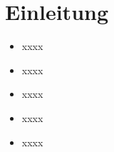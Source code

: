 \section{Einleitung}

\begin{itemize}

   \item xxxx
   \item xxxx
   \item xxxx
   \item xxxx
   \item xxxx
\end{itemize}








